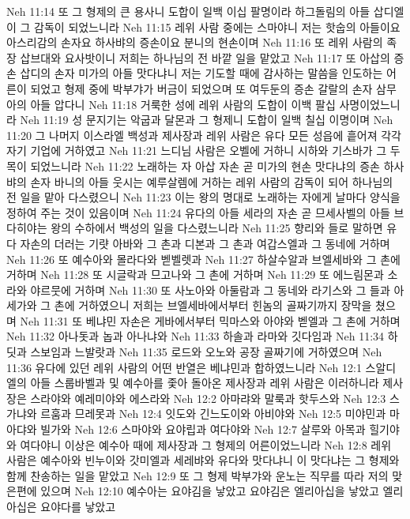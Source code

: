 Neh 11:14  또 그 형제의 큰 용사니 도합이 일백 이십 팔명이라 하그돌림의 아들 삽디엘이 그 감독이 되었느니라
Neh 11:15  레위 사람 중에는 스마야니 저는 핫숩의 아들이요 아스리감의 손자요 하사뱌의 증손이요 분니의 현손이며
Neh 11:16  또 레위 사람의 족장 삽브대와 요사밧이니 저희는 하나님의 전 바깥 일을 맡았고
Neh 11:17  또 아삽의 증손 삽디의 손자 미가의 아들 맛다냐니 저는 기도할 때에 감사하는 말씀을 인도하는 어른이 되었고 형제 중에 박부갸가 버금이 되었으며 또 여두둔의 증손 갈랄의 손자 삼무아의 아들 압다니
Neh 11:18  거룩한 성에 레위 사람의 도합이 이백 팔십 사명이었느니라
Neh 11:19  성 문지기는 악굽과 달몬과 그 형제니 도합이 일백 칠십 이명이며
Neh 11:20  그 나머지 이스라엘 백성과 제사장과 레위 사람은 유다 모든 성읍에 흩어져 각각 자기 기업에 거하였고
Neh 11:21  느디님 사람은 오벨에 거하니 시하와 기스바가 그 두목이 되었느니라
Neh 11:22  노래하는 자 아삽 자손 곧 미가의 현손 맛다냐의 증손 하사뱌의 손자 바니의 아들 웃시는 예루살렘에 거하는 레위 사람의 감독이 되어 하나님의 전 일을 맡아 다스렸으니
Neh 11:23  이는 왕의 명대로 노래하는 자에게 날마다 양식을 정하여 주는 것이 있음이며
Neh 11:24  유다의 아들 세라의 자손 곧 므세사벨의 아들 브다히야는 왕의 수하에서 백성의 일을 다스렸느니라
Neh 11:25  향리와 들로 말하면 유다 자손의 더러는 기럇 아바와 그 촌과 디본과 그 촌과 여갑스엘과 그 동네에 거하며
Neh 11:26  또 예수아와 몰라다와 벧벨렛과
Neh 11:27  하살수알과 브엘세바와 그 촌에 거하며
Neh 11:28  또 시글락과 므고나와 그 촌에 거하며
Neh 11:29  또 에느림몬과 소라와 야르뭇에 거하며
Neh 11:30  또 사노아와 아둘람과 그 동네와 라기스와 그 들과 아세가와 그 촌에 거하였으니 저희는 브엘세바에서부터 힌놈의 골짜기까지 장막을 쳤으며
Neh 11:31  또 베냐민 자손은 게바에서부터 믹마스와 아야와 벧엘과 그 촌에 거하며
Neh 11:32  아나돗과 놉과 아나냐와
Neh 11:33  하솔과 라마와 깃다임과
Neh 11:34  하딧과 스보임과 느발랏과
Neh 11:35  로드와 오노와 공장 골짜기에 거하였으며
Neh 11:36  유다에 있던 레위 사람의 어떤 반열은 베냐민과 합하였느니라
Neh 12:1  스알디엘의 아들 스룹바벨과 및 예수아를 좇아 돌아온 제사장과 레위 사람은 이러하니라 제사장은 스라야와 예레미야와 에스라와
Neh 12:2  아마랴와 말룩과 핫두스와
Neh 12:3  스가냐와 르훔과 므레못과
Neh 12:4  잇도와 긴느도이와 아비야와
Neh 12:5  미야민과 마아댜와 빌가와
Neh 12:6  스마야와 요야립과 여다야와
Neh 12:7  살루와 아목과 힐기야와 여다야니 이상은 예수아 때에 제사장과 그 형제의 어른이었느니라
Neh 12:8  레위 사람은 예수아와 빈누이와 갓미엘과 세레뱌와 유다와 맛다냐니 이 맛다냐는 그 형제와 함께 찬송하는 일을 맡았고
Neh 12:9  또 그 형제 박부갸와 운노는 직무를 따라 저의 맞은편에 있으며
Neh 12:10  예수아는 요야김을 낳았고 요야김은 엘리아십을 낳았고 엘리아십은 요야다를 낳았고
